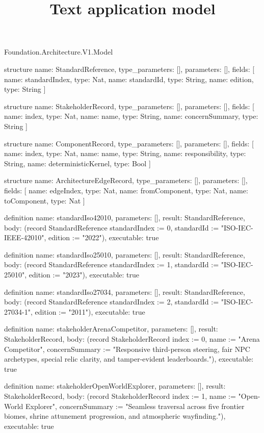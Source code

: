 \begin{lexlean}{Foundation.Architecture.V1.Model}
\title{Text application model}
\begin{semanticmodule}
structure{
  name: StandardReference,
  type_parameters: [],
  parameters: [],
  fields: [
    {name: standardIndex, type: Nat},
    {name: standardId, type: String},
    {name: edition, type: String}
  ]
}

structure{
  name: StakeholderRecord,
  type_parameters: [],
  parameters: [],
  fields: [
    {name: index, type: Nat},
    {name: name, type: String},
    {name: concernSummary, type: String}
  ]
}

structure{
  name: ComponentRecord,
  type_parameters: [],
  parameters: [],
  fields: [
    {name: index, type: Nat},
    {name: name, type: String},
    {name: responsibility, type: String},
    {name: deterministicKernel, type: Bool}
  ]
}

structure{
  name: ArchitectureEdgeRecord,
  type_parameters: [],
  parameters: [],
  fields: [
    {name: edgeIndex, type: Nat},
    {name: fromComponent, type: Nat},
    {name: toComponent, type: Nat}
  ]
}

definition{
  name: standardIso42010,
  parameters: [],
  result: StandardReference,
  body: (record StandardReference {standardIndex := 0, standardId := "ISO-IEC-IEEE-42010", edition := "2022"}),
  executable: true
}

definition{
  name: standardIso25010,
  parameters: [],
  result: StandardReference,
  body: (record StandardReference {standardIndex := 1, standardId := "ISO-IEC-25010", edition := "2023"}),
  executable: true
}

definition{
  name: standardIso27034,
  parameters: [],
  result: StandardReference,
  body: (record StandardReference {standardIndex := 2, standardId := "ISO-IEC-27034-1", edition := "2011"}),
  executable: true
}

definition{
  name: stakeholderArenaCompetitor,
  parameters: [],
  result: StakeholderRecord,
  body: (record StakeholderRecord {index := 0, name := "Arena Competitor", concernSummary := "Responsive third-person steering, fair NPC archetypes, special relic clarity, and tamper-evident leaderboards."}),
  executable: true
}

definition{
  name: stakeholderOpenWorldExplorer,
  parameters: [],
  result: StakeholderRecord,
  body: (record StakeholderRecord {index := 1, name := "Open-World Explorer", concernSummary := "Seamless traversal across five frontier biomes, shrine attunement progression, and atmospheric wayfinding."}),
  executable: true
}


\end{semanticmodule}
\end{lexlean}

